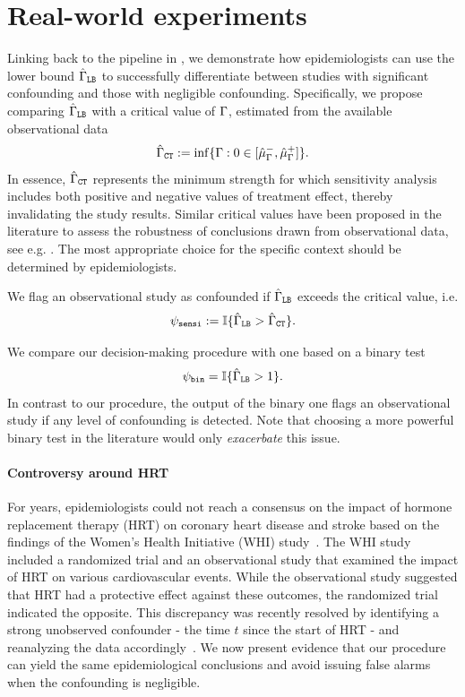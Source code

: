 \section{Real-world experiments}
\label{sec:whi_exp}

Linking back to the pipeline in , we demonstrate how epidemiologists can use the lower bound $\hat{\Gamma}_{\texttt{LB}}$ to successfully differentiate between studies with significant confounding and those with negligible confounding. 
Specifically, we propose comparing $\hat{\Gamma}_{\texttt{LB}}$ with a critical value of $\Gamma$, estimated from the available observational data
$$
\hat{\Gamma}_{\texttt{CT}} := \inf\{ \Gamma : 0 \in [\hat{\mu}^-_{\Gamma}, \hat{\mu}^+_{\Gamma}] \}. 
$$
In essence, $\hat{\Gamma}_{\texttt{CT}}$ represents the minimum strength for which sensitivity analysis includes both positive and negative values of treatment effect, thereby invalidating the study results. Similar critical values have been proposed in the literature to assess the robustness of conclusions drawn from observational data, see e.g. \citet{vanderweele2017sensitivity,jin2023sensitivity}. The most appropriate choice for the specific context should be determined by epidemiologists. 

We flag an observational study as confounded if $\hat{\Gamma}_{\texttt{LB}}$
exceeds the critical value, i.e.
\begin{equation}
\label{test_critical}
\psi_{\texttt{sensi}} := \mathbb{I} \{ \hat{\Gamma}_{\texttt{LB}} > \hat{\Gamma}_{\texttt{CT}}\}.
\end{equation}

We compare our decision-making procedure with one based on a binary test 
$$
\psi_{\texttt{bin}} = \mathbb{I} \{ \hat{\Gamma}_{\texttt{LB}} >1\}.
$$
In contrast to our procedure, the output of the binary one flags an observational study if any level of confounding is detected.  Note that choosing a more powerful binary test in the literature would only \emph{exacerbate} this issue. 

\paragraph{Controversy around HRT} For years, epidemiologists could not reach a consensus on the impact of hormone replacement therapy (HRT) on coronary heart disease and stroke
based on the findings of the Women's Health Initiative (WHI) study~\citep{anderson2003implementation}.
The WHI study included a randomized trial and an observational study that examined the impact of HRT on various cardiovascular events. While the observational study suggested that HRT had a protective effect against these outcomes, the randomized trial indicated the opposite. This discrepancy was recently resolved by identifying a strong unobserved confounder - the time $t$ since the start of HRT - and reanalyzing the data accordingly~\citep{vandenbroucke2009hrt}. We now present evidence that our procedure can yield the same epidemiological conclusions and avoid issuing false alarms when the confounding is negligible. 


